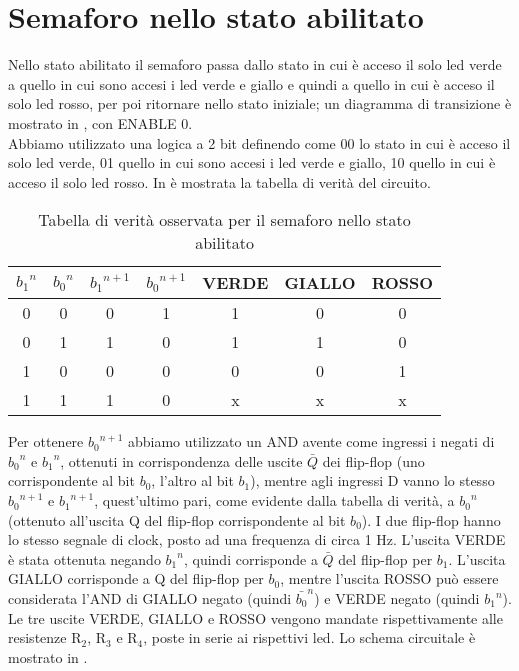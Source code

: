 \section{Semaforo nello stato abilitato}
Nello stato abilitato il semaforo passa dallo stato in cui è acceso il solo led verde a quello in cui sono accesi i led verde e giallo e quindi a quello in cui è acceso il solo led rosso, per poi ritornare nello stato iniziale; un diagramma di transizione è mostrato in , con ENABLE 0.\\
Abbiamo utilizzato una logica a 2 bit definendo come 00 lo stato in cui è acceso il solo led verde, 01 quello in cui sono accesi i led verde e giallo, 10 quello in cui è acceso il solo led rosso. In  è mostrata la tabella di verità del circuito.\\
\begin{table}[h]
	\centering
	\begin{tabular}{*{7}{S[table-figures-exponent = 2]}}
		{${b_1}^{n}$} & {${b_0}^{n}$} & {${b_1}^{n+1}$} & {${b_0}^{n+1}$} & {VERDE} & {GIALLO} & {ROSSO} \\
		 & 0 & 0 & 1 & 1 & 0 & 0\\
           0 & 1 & 1 & 0 & 1 & 1 & 0\\
           1 & 0 & 0 & 0 & 0 & 0 & 1\\
           1 & 1 & 1 & 0 & x & x & x\\
 	\end{tabular}
	\caption{ Tabella di verità osservata per il semaforo nello stato abilitato}
	\label{t:Tabella-verità}
\end{table}
Per ottenere ${b_0}^{n+1}$ abbiamo utilizzato un AND avente come ingressi i negati di ${b_0}^{n}$ e ${b_1}^{n}$, ottenuti in corrispondenza delle uscite $\bar  Q$ dei flip-flop (uno corrispondente al bit $b_0$, l'altro al bit $b_1$), mentre agli ingressi D vanno lo stesso ${b_0}^{n+1}$ e ${b_1}^{n+1}$, quest'ultimo pari, come evidente dalla tabella di verità, a ${b_0}^{n}$ (ottenuto all'uscita Q del flip-flop corrispondente al bit $b_0$). I due flip-flop hanno lo stesso segnale di clock, posto ad una frequenza di circa 1 Hz. L'uscita VERDE è stata ottenuta negando ${b_1}^{n}$, quindi corrisponde a $\bar Q$ del flip-flop per $b_1$. L'uscita GIALLO corrisponde a Q del flip-flop per $b_0$, mentre l'uscita ROSSO può essere considerata l'AND di GIALLO negato (quindi ${\bar{b_0}^{n}}$) e VERDE negato (quindi ${b_1}^{n}$). Le tre uscite VERDE, GIALLO e ROSSO vengono mandate rispettivamente alle resistenze R$_2$, R$_3$ e R$_4$, poste in serie ai rispettivi led. Lo schema circuitale è mostrato in .\\

